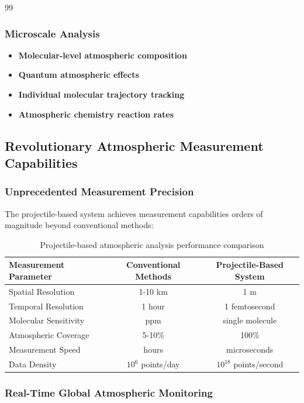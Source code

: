 \documentclass[12pt,a4paper]{article}
\begin{document}
\begin{thebibliography}{99}
\subsubsection{Microscale Analysis}
\begin{itemize}
\item \textbf{Molecular-level atmospheric composition}
\item \textbf{Quantum atmospheric effects}
\item \textbf{Individual molecular trajectory tracking}
\item \textbf{Atmospheric chemistry reaction rates}
\end{itemize}

\subsection{Revolutionary Atmospheric Measurement Capabilities}

\subsubsection{Unprecedented Measurement Precision}

The projectile-based system achieves measurement capabilities orders of magnitude beyond conventional methods:

\begin{table}[H]
\centering
\begin{tabular}{lcc}
\toprule
Measurement Parameter & Conventional Methods & Projectile-Based System \\
\midrule
Spatial Resolution & 1-10 km & 1 m \\
Temporal Resolution & 1 hour & 1 femtosecond \\
Molecular Sensitivity & ppm & single molecule \\
Atmospheric Coverage & 5-10\% & 100\% \\
Measurement Speed & hours & microseconds \\
Data Density & $10^6$ points/day & $10^{18}$ points/second \\
\bottomrule
\end{tabular}
\caption{Projectile-based atmospheric analysis performance comparison}
\end{table}

\subsubsection{Real-Time Global Atmospheric Monitoring}


\end{thebibliography}
\end{document}
